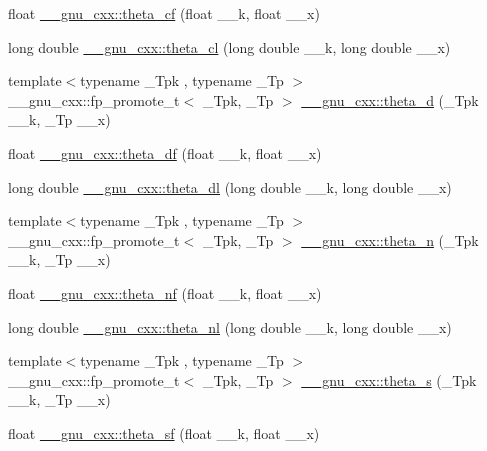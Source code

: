 \begin{DoxyCompactItemize}
float \hyperlink{group__gnu__math__spec__func_ga409f898afeaad5e25726ad552cfe6946}{\+\_\+\+\_\+gnu\+\_\+cxx\+::theta\+\_\+cf} (float \+\_\+\+\_\+k, float \+\_\+\+\_\+x)
\item 
long double \hyperlink{group__gnu__math__spec__func_ga0531098c628999cf396217ff997cfdda}{\+\_\+\+\_\+gnu\+\_\+cxx\+::theta\+\_\+cl} (long double \+\_\+\+\_\+k, long double \+\_\+\+\_\+x)
\item 
{\footnotesize template$<$typename \+\_\+\+Tpk , typename \+\_\+\+Tp $>$ }\\\+\_\+\+\_\+gnu\+\_\+cxx\+::fp\+\_\+promote\+\_\+t$<$ \+\_\+\+Tpk, \+\_\+\+Tp $>$ \hyperlink{group__gnu__math__spec__func_ga258edb995137d9e6344b3cd750266d74}{\+\_\+\+\_\+gnu\+\_\+cxx\+::theta\+\_\+d} (\+\_\+\+Tpk \+\_\+\+\_\+k, \+\_\+\+Tp \+\_\+\+\_\+x)
\item 
float \hyperlink{group__gnu__math__spec__func_gad2dc6fcaf54d25cbfaad082623941118}{\+\_\+\+\_\+gnu\+\_\+cxx\+::theta\+\_\+df} (float \+\_\+\+\_\+k, float \+\_\+\+\_\+x)
\item 
long double \hyperlink{group__gnu__math__spec__func_gacce4474168b9638ebeaad1c7b351fa04}{\+\_\+\+\_\+gnu\+\_\+cxx\+::theta\+\_\+dl} (long double \+\_\+\+\_\+k, long double \+\_\+\+\_\+x)
\item 
{\footnotesize template$<$typename \+\_\+\+Tpk , typename \+\_\+\+Tp $>$ }\\\+\_\+\+\_\+gnu\+\_\+cxx\+::fp\+\_\+promote\+\_\+t$<$ \+\_\+\+Tpk, \+\_\+\+Tp $>$ \hyperlink{group__gnu__math__spec__func_ga202778bd650e04e9f3729bfca35c32e2}{\+\_\+\+\_\+gnu\+\_\+cxx\+::theta\+\_\+n} (\+\_\+\+Tpk \+\_\+\+\_\+k, \+\_\+\+Tp \+\_\+\+\_\+x)
\item 
float \hyperlink{group__gnu__math__spec__func_ga5298a95e02bd909d55e59c1f2a0b51f8}{\+\_\+\+\_\+gnu\+\_\+cxx\+::theta\+\_\+nf} (float \+\_\+\+\_\+k, float \+\_\+\+\_\+x)
\item 
long double \hyperlink{group__gnu__math__spec__func_ga907f6c147387d55d2dfccbc58d1f1bc5}{\+\_\+\+\_\+gnu\+\_\+cxx\+::theta\+\_\+nl} (long double \+\_\+\+\_\+k, long double \+\_\+\+\_\+x)
\item 
{\footnotesize template$<$typename \+\_\+\+Tpk , typename \+\_\+\+Tp $>$ }\\\+\_\+\+\_\+gnu\+\_\+cxx\+::fp\+\_\+promote\+\_\+t$<$ \+\_\+\+Tpk, \+\_\+\+Tp $>$ \hyperlink{group__gnu__math__spec__func_gaf28f2dca107531890b49cccf2bdd67be}{\+\_\+\+\_\+gnu\+\_\+cxx\+::theta\+\_\+s} (\+\_\+\+Tpk \+\_\+\+\_\+k, \+\_\+\+Tp \+\_\+\+\_\+x)
\item 
float \hyperlink{group__gnu__math__spec__func_ga5e69cf30c9a4cc057accc43e8c4bf7a3}{\+\_\+\+\_\+gnu\+\_\+cxx\+::theta\+\_\+sf} (float \+\_\+\+\_\+k, float \+\_\+\+\_\+x)

\end{DoxyCompactItemize}

